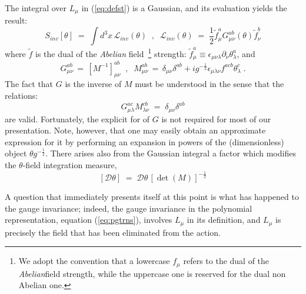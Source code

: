 \documentclass[a4paper,12pt]{article}
\begin{document}
The integral over $L_\mu$ in (\ref{eq:defst}) is a Gaussian, and its
evaluation yields the result:
\begin{equation}\label{eq:st}
S_{inv}[\theta] \;=\; \int d^3x \, {\mathcal L}_{inv}(\theta)\;\;,\;\;
{\mathcal L}_{inv}(\theta) \;=\; \frac{1}{2} {\tilde f}_\mu^a
G_{\mu\nu}^{ab}(\theta){\tilde f}_\nu^b
\end{equation}
where $\tilde f$ is the dual of the {\em Abelian\/} field~\footnote{
  We adopt the convention that a lowercase $f_\mu$ refers to the dual
  of the {\em Abelian\/}field strength, while the uppercase one is
  reserved for the dual non Abelian one.} strength: \mbox{${\tilde
    f}_\mu^a \equiv \epsilon_{\mu\nu\lambda}\partial_\nu
  \theta^a_\lambda$}, and
\begin{equation}\label{eq:defg}
G_{\mu\nu}^{ab} \,=\, [ M^{-1} ]_{\mu\nu}^{ab}
\;\;,\;\;
M_{\mu\nu}^{ab}\,=\, \delta_{\mu\nu}\delta^{ab} + i g^{-\frac{1}{2}}
\epsilon_{\mu\lambda\nu} f^{acb} \theta_\lambda^c\;.
\end{equation}
The fact that $G$ is the inverse of $M$ must be understood in the
sense that the relations:
\begin{equation}\label{eq:definv}
G_{\mu\lambda}^{ac} M_{\lambda\nu}^{cb} \;=\; \delta_{\mu\nu} \delta^{ab}
\end{equation}
are valid. Fortunately, the explicit for of $G$ is not required for
most of our presentation. Note, however, that one may easily obtain an
approximate expression for it by performing an expansion in powers of
the (dimensionless) object $\theta g^{-\frac{1}{2}}$.  There arises
also from the Gaussian integral a factor which modifies the
$\theta$-field integration measure,
\begin{equation}\label{eq:thmeas}
[{\mathcal D}\theta]\;=\; {\mathcal D}\theta \, [\det(M)]^{-\frac{1}{2}}
\end{equation}

A question that immediately presents itself at this point is what has
happened to the gauge invariance; indeed, the gauge invariance in the
polynomial representation, equation (\ref{eq:pgtrns}), involves
$L_\mu$ in its definition, and $L_\mu$ is precisely the field that has
been eliminated from the action.
\end{document}
